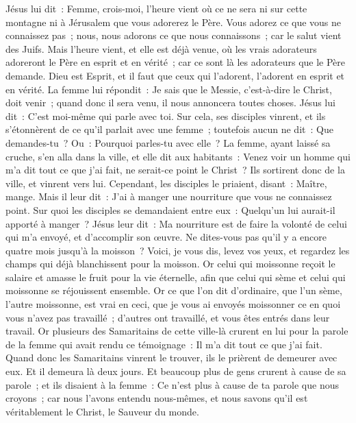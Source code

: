 \begin{multicols}{2}
Jésus lui dit~: Femme, crois-moi, l'heure vient où ce ne sera ni sur cette montagne ni à Jérusalem que vous adorerez le Père.
Vous adorez ce que vous ne connaissez pas~; nous, nous adorons ce que nous connaissons~; car le salut vient des Juifs.
Mais l'heure vient, et elle est déjà venue, où les vrais adorateurs adoreront le Père en esprit et en vérité~; car ce sont là les adorateurs que le Père demande.
Dieu est Esprit, et il faut que ceux qui l'adorent, l'adorent en esprit et en vérité.
La femme lui répondit~: Je sais que le Messie, c'est-à-dire le Christ, doit venir~; quand donc il sera venu, il nous annoncera toutes choses.
Jésus lui dit~: C'est moi-même qui parle avec toi.
Sur cela, ses disciples vinrent, et ils s'étonnèrent de ce qu'il parlait avec une femme~; toutefois aucun ne dit~: Que demandes-tu~? Ou~: Pourquoi parles-tu avec elle~?
La femme, ayant laissé sa cruche, s'en alla dans la ville, et elle dit aux habitants~:
Venez voir un homme qui m'a dit tout ce que j'ai fait, ne serait-ce point le Christ~?
Ils sortirent donc de la ville, et vinrent vers lui.
Cependant, les disciples le priaient, disant~: Maître, mange.
Mais il leur dit~: J'ai à manger une nourriture que vous ne connaissez point.
Sur quoi les disciples se demandaient entre eux~: Quelqu'un lui aurait-il apporté à manger~?
Jésus leur dit~: Ma nourriture est de faire la volonté de celui qui m'a envoyé, et d'accomplir son œuvre.
Ne dites-vous pas qu'il y a encore quatre mois jusqu'à la moisson~? Voici, je vous dis, levez vos yeux, et regardez les champs qui déjà blanchissent pour la moisson.
Or celui qui moissonne reçoit le salaire et amasse le fruit pour la vie éternelle, afin que celui qui sème et celui qui moissonne se réjouissent ensemble.
Or ce que l'on dit d'ordinaire, que l'un sème, l'autre moissonne, est vrai en ceci,
que je vous ai envoyés moissonner ce en quoi vous n'avez pas travaillé~; d'autres ont travaillé, et vous êtes entrés dans leur travail.
Or plusieurs des Samaritains de cette ville-là crurent en lui pour la parole de la femme qui avait rendu ce témoignage~: Il m'a dit tout ce que j'ai fait.
Quand donc les Samaritains vinrent le trouver, ils le prièrent de demeurer avec eux. Et il demeura là deux jours.
Et beaucoup plus de gens crurent à cause de sa parole~;
et ils disaient à la femme~: Ce n'est plus à cause de ta parole que nous croyons~; car nous l'avons entendu nous-mêmes, et nous savons qu'il est véritablement le Christ, le Sauveur du monde.

\end{multicols}
